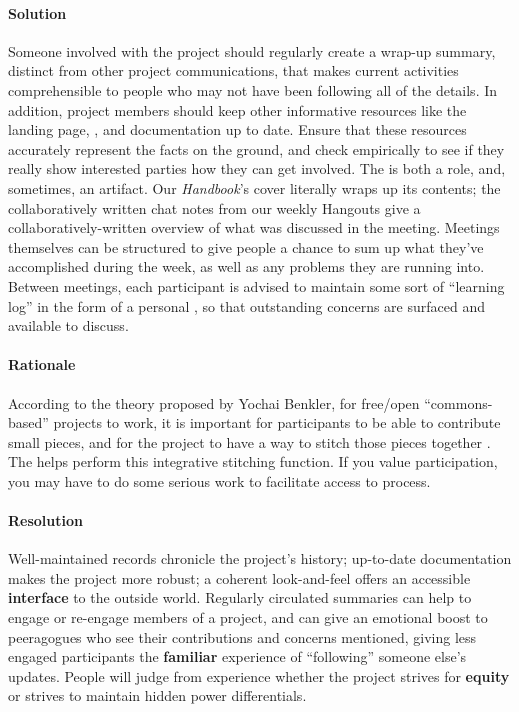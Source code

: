 \begin{refsection}
\paragraph{Solution}
Someone involved with the project should regularly create a wrap-up
summary, distinct from other project communications, that makes
current activities comprehensible to people who may not have been
following all of the details.  In addition, project members should
keep other informative resources like the landing page,
, and documentation up to date. Ensure that these
resources accurately represent the facts on the ground, and check
empirically to see if they really show interested parties how they can
get involved.  The  is both a role, and,
sometimes, an artifact.  Our \emph{Handbook}'s cover literally wraps
up its contents; the collaboratively written chat notes from our
weekly Hangouts give a collaboratively-written overview of what was
discussed in the meeting.  Meetings themselves can be structured to
give people a chance to sum up what they've accomplished during the
week, as well as any problems they are running into.  Between
meetings, each participant is advised to maintain some sort of
``learning log'' in the form of a personal , so
that outstanding concerns are surfaced and available to discuss.

\paragraph{Rationale}
According to the theory proposed by Yochai Benkler, for free/open ``commons-based'' projects to work, it is important for participants to be able to contribute small pieces, and for the project to have a way to stitch those pieces together \cite{coases-penguin}. The  helps perform this integrative stitching function. If you value participation, you may have to do some serious work to facilitate access to process.

\paragraph{Resolution} 
Well-maintained records chronicle the project's history; up-to-date documentation makes the project more robust; a coherent look-and-feel offers an accessible \textbf{interface} to the outside world. Regularly circulated summaries can help to engage or re-engage members of a project, and can give an emotional boost to peeragogues who see their contributions and concerns mentioned, giving less engaged participants the \textbf{familiar} experience of ``following'' someone else's updates. People will judge from experience whether the project strives for \textbf{equity} or strives to maintain hidden power differentials.  


\end{refsection}
